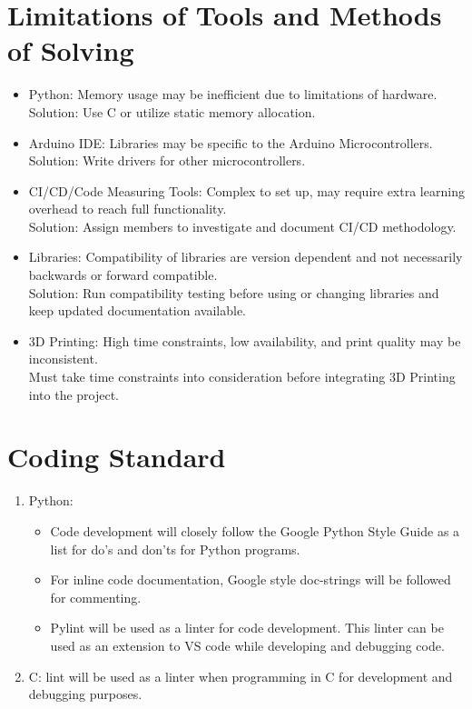 \documentclass[12pt]{article}
\begin{document}
\section{Limitations of Tools and Methods of Solving}

\begin{itemize}
\item Python: Memory usage may be inefficient due to limitations of hardware. \\ Solution: Use C or utilize static memory allocation.
\item Arduino IDE: Libraries may be specific to the Arduino Microcontrollers. \\ Solution: Write drivers for other microcontrollers.
\item CI/CD/Code Measuring Tools: Complex to set up, may require extra learning overhead to reach full functionality. \\ Solution: Assign members to investigate and document CI/CD methodology.
\item Libraries: Compatibility of libraries are version dependent and not necessarily backwards or forward compatible. \\ Solution: Run compatibility testing before using or changing libraries and keep updated documentation available.
\item 3D Printing: High time constraints, low availability, and print quality may be inconsistent. \\ Must take time constraints into consideration before integrating 3D Printing into the project.
\end{itemize}

\pagebreak

\section{Coding Standard}
\begin{enumerate}
\item Python:
\begin{itemize} 
\item Code development will closely follow the Google Python Style Guide as a list for do's and don'ts for Python programs.
\item For inline code documentation, Google style doc-strings will be followed for commenting.
\item Pylint will be used as a linter for code development. This linter can be used as an extension to VS code while developing and debugging code.
\end{itemize}
\item C: lint will be used as a linter when programming in C for development and debugging purposes.
\end{enumerate}
\end{document}
